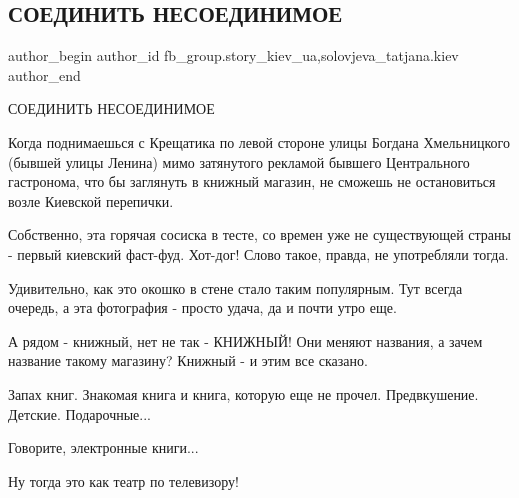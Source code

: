  
 
 
 
 
 
\subsection{СОЕДИНИТЬ НЕСОЕДИНИМОЕ}
\label{sec:11_02_2022.fb.fb_group.story_kiev_ua.1.soedinit_nesoedinimoe}
 
\ifcmt
 author_begin
   author_id fb_group.story_kiev_ua,solovjeva_tatjana.kiev
 author_end
\fi

СОЕДИНИТЬ НЕСОЕДИНИМОЕ

Когда поднимаешься с  Крещатика по левой стороне улицы Богдана Хмельницкого
(бывшей улицы Ленина) мимо затянутого рекламой бывшего Центрального гастронома,
что бы заглянуть в книжный магазин, не сможешь не остановиться возле Киевской
перепички. 


Собственно, эта горячая сосиска в тесте, со времен уже не существующей страны -
первый киевский фаст-фуд. Хот-дог! Слово такое, правда, не употребляли тогда. 

Удивительно, как это окошко в стене стало таким популярным. Тут всегда очередь,
а эта фотография - просто удача, да и почти утро еще.


А рядом - книжный, нет не так - КНИЖНЫЙ! Они меняют названия, а зачем название
такому магазину? Книжный - и этим все сказано. 

Запах книг. Знакомая книга и книга, которую еще не прочел. Предвкушение.
Детские. Подарочные...

Говорите, электронные книги...

Ну тогда это как театр по телевизору!


